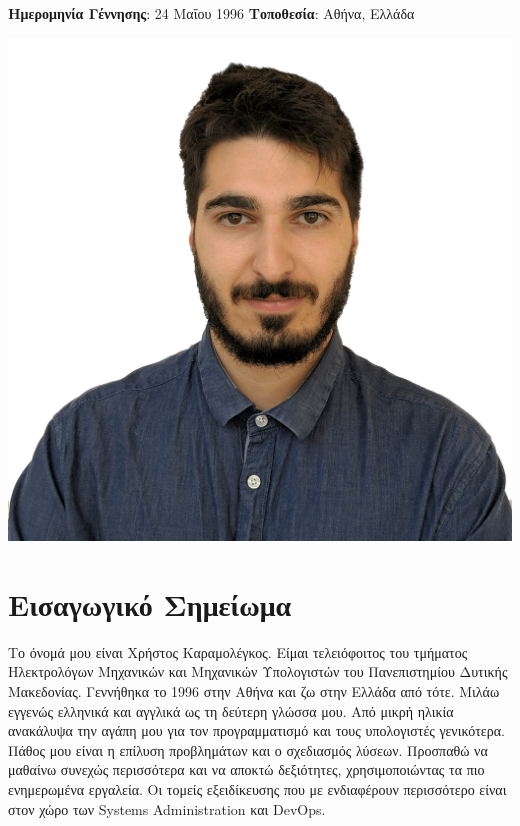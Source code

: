 \documentclass{mycv}
\begin{document}
	\pagestyle{empty}
	\begin{minipage}{.7\textwidth}
		\begin{flushleft}
			\centering
			{\bf Ημερομηνία Γέννησης}: 24 Μαΐου 1996 {\Large\textperiodcentered} {\bf Τοποθεσία}: Αθήνα, Ελλάδα
		\end{flushleft}
	\end{minipage}
	\begin{minipage}{.3\textwidth}
		\begin{flushright}
			\includegraphics[scale=0.05]{assets/christos.png}
		\end{flushright}
	\end{minipage}
	\vspace*{-0.5cm}
	\section{Εισαγωγικό Σημείωμα}
	\textnormal Το όνομά μου είναι Χρήστος Καραμολέγκος. Είμαι τελειόφοιτος του τμήματος Ηλεκτρολόγων Μηχανικών και Μηχανικών Υπολογιστών του Πανεπιστημίου Δυτικής Μακεδονίας. Γεννήθηκα το 1996 στην Αθήνα και ζω στην Ελλάδα από τότε. Μιλάω εγγενώς ελληνικά και αγγλικά ως τη δεύτερη γλώσσα μου. Από μικρή ηλικία ανακάλυψα την αγάπη μου για τον προγραμματισμό και τους υπολογιστές γενικότερα. Πάθος μου είναι η επίλυση προβλημάτων και ο σχεδιασμός λύσεων. Προσπαθώ να μαθαίνω συνεχώς περισσότερα και να αποκτώ δεξιότητες, χρησιμοποιώντας τα πιο ενημερωμένα εργαλεία. Οι τομείς εξειδίκευσης που με ενδιαφέρουν περισσότερο είναι στον χώρο των Systems Administration και DevOps.
	
\end{document}
